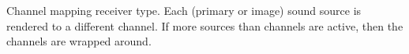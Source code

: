 Channel mapping receiver type. Each (primary or image) sound source is
rendered to a different channel. If more sources than channels are
active, then the channels are wrapped around.
